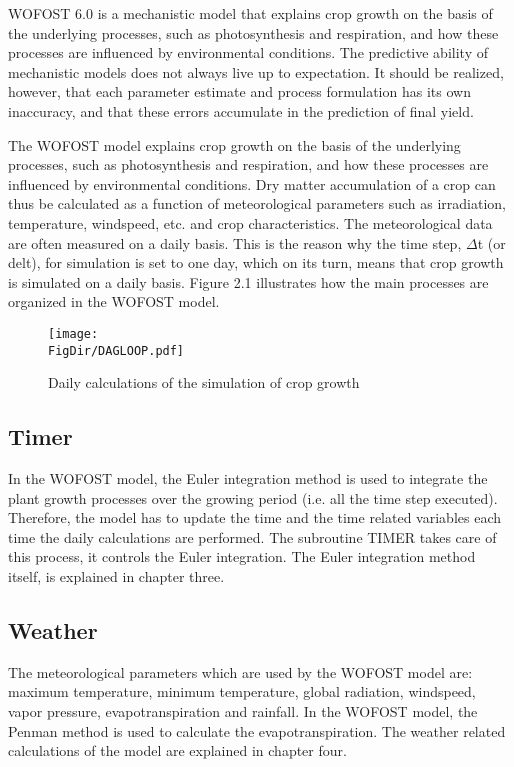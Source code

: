 WOFOST 6.0 is a mechanistic model that explains crop growth on the basis of the 
underlying processes, such as photosynthesis and respiration, and how these processes are
influenced by environmental conditions. The predictive ability of mechanistic models does
not always live up to expectation. It should be realized, however, that each parame\-ter
estimate and process formulation has its own inaccura\-cy, and that these errors accumulate
in the prediction of final yield.

The WOFOST model explains crop growth on the basis of the underly\-ing processes, such
as photosynthesis and respira\-tion, and how these processes are influenced by environ\-mental 
conditions. Dry matter accumulation of a crop can thus be calculated as a function
of meteorological parameters such as irradiation, temperature, windspeed, etc. and crop
characteristics. The meteorological data are often measured on a daily basis. This is the
reason why the time step, $\Delta$t (or delt), for simulation is set to one day, which on its turn,
means that crop growth is simulated on a daily basis. Figure 2.1 illustrates how the main
processes are organized in the WOFOST model.

\begin{figure}[htbp]
\centering
\texttt{[image: \\FigDir/DAGLOOP.pdf]}
\caption{Daily calculations of the simulation of crop growth}
\end{figure}

\subsection{Timer}
In the WOFOST model, the Euler integration method is used to integrate the plant growth
processes over the growing period (i.e. all the time step executed). Therefore, the model
has to update the time and the time related variables each time the daily calcula\-tions are
performed. The subroutine TIMER takes care of this process, it controls the Euler
integration. The Euler integration method itself, is explained in chapter three.

\subsection{Weather}
The meteorological parameters which are used by the WOFOST model are: maxi\-mum
temperature, minimum temperature, global radiation, windspeed, vapor pressure,
evapotranspiration and rainfall. In the WOFOST model, the Penman method is used to
calculate the evapotr\-anspiration. The weather related calculations of the model are
explained in chapter four.

